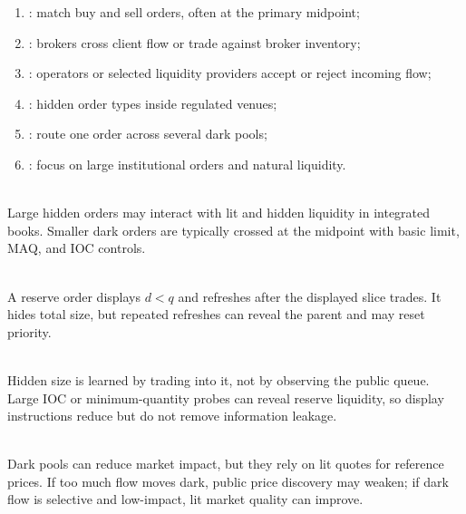\documentclass[a4paper,oneside,openany]{book}
\begin{document}
\begin{taxonomy} 
\begin{enumerate}[label=\roman*.]
\setlength{\itemsep}{0pt}
\item {}: match buy and sell orders, often at the primary midpoint;
\item {}: brokers cross client flow or trade against broker inventory;
\item {}: operators or selected liquidity providers accept or reject incoming flow;
\item {}: hidden order types inside regulated venues;
\item {}: route one order across several dark pools;
\item {}: focus on large institutional orders and natural liquidity.
\end{enumerate}
\end{taxonomy}

\begin{mechanism} \\
Large hidden orders may interact with lit and hidden liquidity in integrated books. Smaller dark orders are typically crossed at the midpoint with basic limit, MAQ, and IOC controls.
\end{mechanism}

\begin{mechanism} \\
A reserve order displays $d<q$ and refreshes after the displayed slice trades. It hides total size, but repeated refreshes can reveal the parent and may reset priority.
\end{mechanism}

\begin{caveat} \\
Hidden size is learned by trading into it, not by observing the public queue. Large IOC or minimum-quantity probes can reveal reserve liquidity, so display instructions reduce but do not remove information leakage.
\end{caveat}

\begin{caveat} \\
Dark pools can reduce market impact, but they rely on lit quotes for reference prices. If too much flow moves dark, public price discovery may weaken; if dark flow is selective and low-impact, lit market quality can improve.
\end{caveat}
\end{document}

